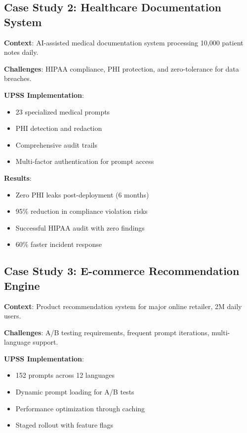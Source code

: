 \subsection{Case Study 2: Healthcare Documentation System}

\textbf{Context}: AI-assisted medical documentation system processing 10,000 patient notes daily.

\textbf{Challenges}: HIPAA compliance, PHI protection, and zero-tolerance for data breaches.

\textbf{UPSS Implementation}:
\begin{itemize}
    \item 23 specialized medical prompts
    \item PHI detection and redaction
    \item Comprehensive audit trails
    \item Multi-factor authentication for prompt access
\end{itemize}

\textbf{Results}:
\begin{itemize}
    \item Zero PHI leaks post-deployment (6 months)
    \item 95\% reduction in compliance violation risks
    \item Successful HIPAA audit with zero findings
    \item 60\% faster incident response
\end{itemize}

\subsection{Case Study 3: E-commerce Recommendation Engine}

\textbf{Context}: Product recommendation system for major online retailer, 2M daily users.

\textbf{Challenges}: A/B testing requirements, frequent prompt iterations, multi-language support.

\textbf{UPSS Implementation}:
\begin{itemize}
    \item 152 prompts across 12 languages
    \item Dynamic prompt loading for A/B tests
    \item Performance optimization through caching
    \item Staged rollout with feature flags
\end{itemize}

